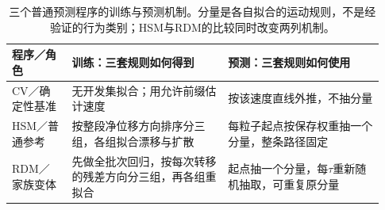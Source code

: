 \begin{table}[!htbp]\centering\small
\caption{三个普通预测程序的训练与预测机制。分量是各自拟合的运动规则，不是经验证的行为类别；HSM与RDM的比较同时改变两列机制。}
\label{tab:procedure-mechanisms}
\begin{tabular}{@{}p{0.15\linewidth}p{0.39\linewidth}p{0.39\linewidth}@{}}\toprule
程序／角色 & 训练：三套规则如何得到 & 预测：三套规则如何使用\\\midrule
CV／确定性基准 & 无开发集拟合；用允许前缀估计速度 & 按该速度直线外推，不抽分量\\
HSM／普通参考 & 按整段净位移方向排序分三组，各组拟合漂移与扩散 & 每粒子起点按保存权重抽一个分量，整条路径固定\\
RDM／家族变体 & 先做全批次回归，按每次转移的残差方向分三组，再各组重拟合 & 起点抽一个分量，每$\tau$重新随机抽取，可重复原分量\\\bottomrule
\end{tabular}
\end{table}
